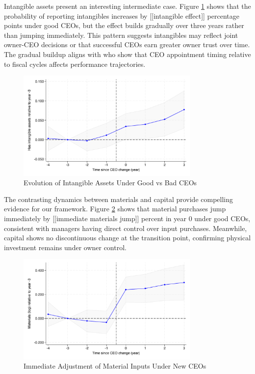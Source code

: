 \documentclass[11pt,a4paper]{article}
\begin{document}
Intangible assets present an interesting intermediate case. Figure \ref{fig:intangibles} shows that the probability of reporting intangibles increases by [[intangible effect]] percentage points under good CEOs, but the effect builds gradually over three years rather than jumping immediately. This pattern suggests intangibles may reflect joint owner-CEO decisions or that successful CEOs earn greater owner trust over time. The gradual buildup aligns with \citet{li2024ceo} who show that CEO appointment timing relative to fiscal cycles affects performance trajectories.

\begin{figure}[htbp]
\centering
\includegraphics[width=0.8\textwidth]{figure/event_study_has_intangible.pdf}
\caption{Evolution of Intangible Assets Under Good vs Bad CEOs}
\label{fig:intangibles}
\end{figure}

The contrasting dynamics between materials and capital provide compelling evidence for our framework. Figure \ref{fig:materials} shows that material purchases jump immediately by [[immediate materials jump]] percent in year 0 under good CEOs, consistent with managers having direct control over input purchases. Meanwhile, capital shows no discontinuous change at the transition point, confirming physical investment remains under owner control.

\begin{figure}[htbp]
\centering
\includegraphics[width=0.8\textwidth]{figure/event_study_lnM.pdf}
\caption{Immediate Adjustment of Material Inputs Under New CEOs}
\label{fig:materials}
\end{figure}
\end{document}
